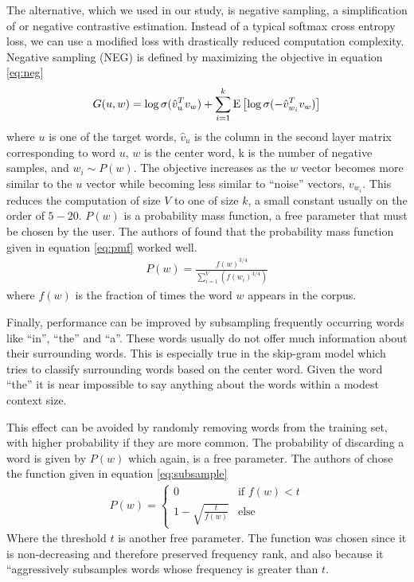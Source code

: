 The alternative, which we used in our study, is negative sampling, a simplification of  or negative contrastive estimation. \cite{mg12} Instead of a typical softmax cross entropy loss,  we can use a modified loss with drastically reduced computation complexity.  Negative sampling (NEG) is defined by maximizing the objective in equation \ref{eq:neg}
\begin{align}\label{eq:neg}
G(u,w) = \log \sigma (\hat{v}_u^Tv_w) + \sum_{i=1}^{k} \E{\log\sigma(-\hat{v}_{w_i}^Tv_w)}
\end{align}
where $u$ is one of the target words, $\hat{v}_u$ is the column in the second layer matrix corresponding to word $u$, $w$ is the center word, k is the number of negative samples, and $w_i \sim P(w)$.  The objective increases as the $w$ vector becomes more similar to the $u$ vector while becoming less similar to ``noise'' vectors, $v_{w_i}$.  This reduces the computation of size $V$ to one of size $k$, a small constant usually on the order of $5-20$.  $P(w)$ is a probability mass function, a free parameter that must be chosen by the user.  The authors of \cite{tm13} found that the probability mass function given in equation \ref{eq:pmf} worked well.
\begin{align}\label{eq:pmf}
P(w) = \frac{f(w)^{3/4}}{\sum_{i=1}^V(f(w_i)^{3/4})}
\end{align}
where $f(w)$ is the fraction of times the word $w$ appears in the corpus.  

Finally, performance can be improved by subsampling frequently occurring words like ``in'', ``the'' and ``a''.  These words usually do not offer much information about their surrounding words.  This is especially true in the skip-gram model which tries to classify surrounding words based on the center word.  Given the word ``the'' it is near impossible to say anything about the words within a modest context size.

This effect can be avoided by randomly removing words from the training set, with higher probability if they are more common.  The probability of discarding a word is given by $P(w)$ which again, is a free parameter.  The authors of \cite{tm13} chose the function given in equation \ref{eq:subsample}
\begin{align}\label{eq:subsample}
P(w) = 
\begin{cases}
0 & \text{if $f(w) < t$} \\
1 - \sqrt{\frac{t}{f(w)}} & \text{else}
\end{cases}
\end{align}
Where the threshold $t$ is another free parameter.  The function was chosen since it is non-decreasing and therefore preserved frequency rank, and also because it ``aggressively subsamples words whose frequency is greater than $t$. \cite{tm13}
